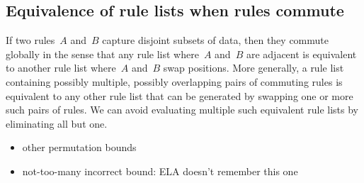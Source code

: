 \subsection{Equivalence of rule lists when rules commute}

If two rules~$A$ and~$B$ capture disjoint subsets of data,
then they commute globally in the sense that any rule list where~$A$ and~$B$ are
adjacent is equivalent to another rule list where~$A$ and~$B$ swap positions.
%
More generally, a rule list containing possibly multiple, possibly overlapping
pairs of commuting rules is equivalent to any other rule list that can be generated
by swapping one or more such pairs of rules.
%
We can avoid evaluating multiple such equivalent rule lists by eliminating all but one.
%

\begin{itemize}
\item other permutation bounds
\item not-too-many incorrect bound:  ELA doesn't remember this one
\end{itemize}







